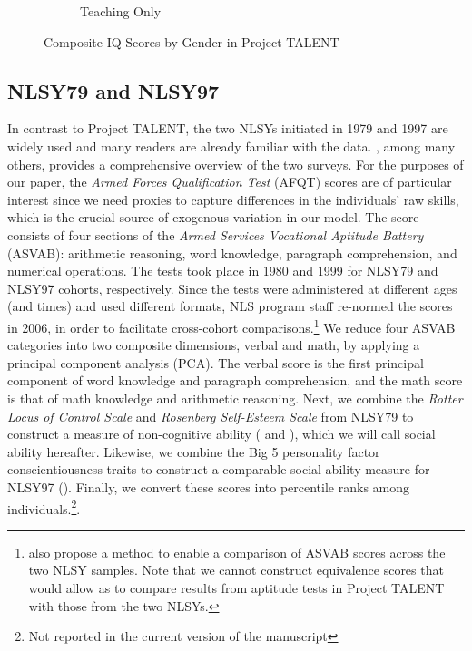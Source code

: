 \documentclass[onehalfspacing,11pt]{article}
\begin{document}
\begin{figure}
\begin{subfigure}{0.49\textwidth}
			\caption{Teaching Only}
			\label{fig:IQbygenderteach}
		\end{subfigure}
		\caption{Composite IQ Scores by Gender in Project TALENT}
		\label{fig:IQbygender}
	\end{figure}
	
	
	\subsection{NLSY79 and NLSY97}
	In contrast to Project TALENT, the two NLSYs initiated in 1979 and 1997 are widely used and many readers are already familiar with the data. \cite{Cooksey:2018}, among many others, provides a comprehensive overview of the two surveys. For the purposes of our paper, the {\it Armed Forces Qualification Test} (AFQT) scores are of particular interest since we need proxies to capture differences in the individuals' raw skills, which is the crucial source of exogenous variation in our model. The score consists of four sections of the {\it Armed Services Vocational Aptitude Battery} (ASVAB): arithmetic reasoning, word knowledge, paragraph comprehension, and numerical operations. The tests took place in 1980 and 1999 for NLSY79 and NLSY97 cohorts, respectively. Since the tests were administered at different ages (and times) and used different formats, NLS program staff re-normed the scores in 2006, in order to facilitate cross-cohort comparisons.\footnote{\cite{Altonji:2009} also propose a method to enable a comparison of ASVAB scores across the two NLSY samples. Note that we cannot construct equivalence scores that would allow as to compare results from aptitude tests in Project TALENT with those from the two NLSYs.} We reduce four ASVAB categories into two composite dimensions, verbal and math, by applying a principal component analysis (PCA). The verbal score is the first principal component of word knowledge and paragraph comprehension, and the math score is that of math knowledge and arithmetic reasoning. 
	Next, we combine the {\it Rotter Locus of Control Scale} and {\it Rosenberg Self-Esteem Scale} from NLSY79 to construct a measure of non-cognitive ability (\cite{Heckman:2006} and \cite{Bowles:2001}), which we will call social ability hereafter. Likewise, we combine the Big 5 personality factor conscientiousness traits to construct a comparable social ability measure for NLSY97 (\cite{Deming:2017}). Finally, we convert these scores into percentile ranks among individuals.\footnote{Not reported in the current version of the manuscript}. 
	
\end{document}
